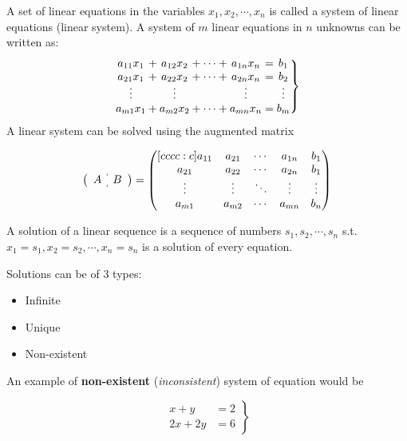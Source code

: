 
A set of linear equations in the variables $x_1, x_2, \cdots, x_n$ is called a system of linear equations (linear system). A system of $m$ linear equations in $n$ unknowns can be written as:
\[
  \left.\begin{array}{@{}*{7}{c@{}}}
    a_{11} x_1 & {}+{} & a_{12} x_2 & {}+ \cdots +{} & a_{1n} x_n & {}={} & b_1\\
    a_{21} x_1 & {}+{} & a_{22} x_2 & {}+ \cdots +{} & a_{2n} x_n & {}={} & b_2\\[-2pt]
    \vdots     &       & \vdots     &                & \vdots     &       & \vdots\\
    a_{m1} x_1 & {}+{} & a_{m2} x_2 & {}+ \cdots +{} & a_{mn} x_n & {}={} & b_m
\end{array}\right\}
\]
A linear system can be solved using the augmented matrix 

\begin{equation*}
  \left(\begin{array}{c:c}A & B\end{array}\right) = 
    \begin{pmatrix}[cccc:c] 
    a_{11} & a_{21} & \cdots & a_{1n} & b_1\\
    a_{21} & a_{22} & \cdots & a_{2n} & b_1\\
    \vdots & \vdots & \ddots & \vdots & \vdots\\
    a_{m1} & a_{m2} & \cdots & a_{mn} & b_n
  \end{pmatrix} 
\end{equation*}  

A solution of a linear sequence is a sequence of numbers $s_1, s_2, \cdots , s_n$ s.t. $x_1 = s_1, x_2 = s_2 , \cdots , x_n = s_n$ is a solution of every equation.

Solutions can be of 3 types:

\begin{itemize}
  \item Infinite
  \item Unique
  \item Non-existent
\end{itemize}

An example of \textbf{non-existent} (\emph{inconsistent}) system of equation would be

\[ \left.\begin{array}{cr}
    x+y&=2\\
    2x+2y&=6
\end{array}\right\} \]

